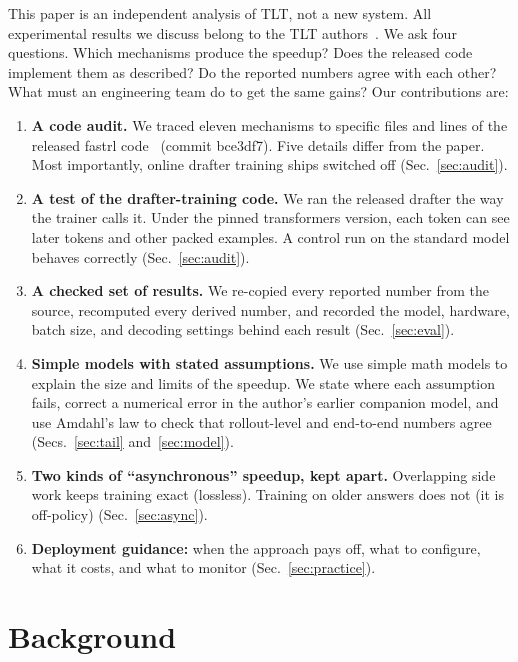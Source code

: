 \documentclass[conference]{IEEEtran}
\newcommand{\brkus}{\textunderscore\allowbreak}
\newcommand{\code}[1]{{\small\ttfamily\let\_\brkus\hyphenchar\font=-1 #1}}
\begin{document}
This paper is an independent analysis of TLT, not a new system. All experimental results we discuss belong to the TLT authors~\cite{hu2026tlt}. We ask four questions. Which mechanisms produce the speedup? Does the released code implement them as described? Do the reported numbers agree with each other? What must an engineering team do to get the same gains? Our contributions are:
\begin{enumerate}
\item \textbf{A code audit.} We traced eleven mechanisms to specific files and lines of the released \code{fastrl} code~\cite{fastrl} (commit \code{bce3df7}). Five details differ from the paper. Most importantly, online drafter training ships switched off (Sec.~\ref{sec:audit}).
\item \textbf{A test of the drafter-training code.} We ran the released drafter the way the trainer calls it. Under the pinned \code{transformers} version, each token can see later tokens and other packed examples. A control run on the standard model behaves correctly (Sec.~\ref{sec:audit}).
\item \textbf{A checked set of results.} We re-copied every reported number from the source, recomputed every derived number, and recorded the model, hardware, batch size, and decoding settings behind each result (Sec.~\ref{sec:eval}).
\item \textbf{Simple models with stated assumptions.} We use simple math models to explain the size and limits of the speedup. We state where each assumption fails, correct a numerical error in the author's earlier companion model, and use Amdahl's law to check that rollout-level and end-to-end numbers agree (Secs.~\ref{sec:tail} and~\ref{sec:model}).
\item \textbf{Two kinds of ``asynchronous'' speedup, kept apart.} Overlapping side work keeps training exact (lossless). Training on older answers does not (it is off-policy) (Sec.~\ref{sec:async}).
\item \textbf{Deployment guidance:} when the approach pays off, what to configure, what it costs, and what to monitor (Sec.~\ref{sec:practice}).
\end{enumerate}

\section{Background}
\label{sec:background}
\end{document}
